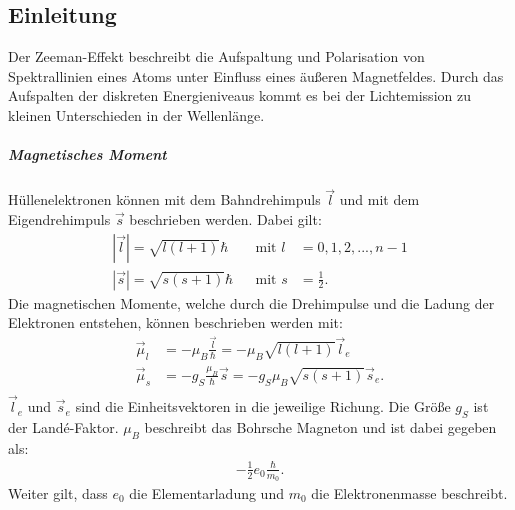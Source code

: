 \subsection{Einleitung}
Der Zeeman-Effekt beschreibt die Aufspaltung und Polarisation von Spektrallinien eines Atoms unter Einfluss eines äußeren Magnetfeldes.
Durch das Aufspalten der diskreten Energieniveaus kommt es bei der Lichtemission zu kleinen Unterschieden in der Wellenlänge.

\subparagraph{Magnetisches Moment}
Hüllenelektronen können mit dem Bahndrehimpuls $\vec{l}$ und mit dem Eigendrehimpuls $\vec{s}$ beschrieben werden.
Dabei gilt:
\begin{align*}
  |\vec{l}|=\sqrt{l(l+1)}\hbar&& \text{mit } l &= 0,1,2,...,n-1\\
  |\vec{s}|=\sqrt{s(s+1)}\hbar&& \text{mit } s &= \frac{1}{2}.
\end{align*}
Die magnetischen Momente, welche durch die Drehimpulse und die Ladung der Elektronen entstehen, können beschrieben werden mit:
\begin{align*}
  \vec{\mu}_l &= -\mu_B \frac{\vec{l}}{\hbar} = -\mu_B \sqrt{l(l+1)}\vec{l}_e\\
  \vec{\mu}_s &= -g_S \frac{\mu_B}{\hbar}\vec{s} = -g_S \mu_B \sqrt{s(s+1)}\vec{s}_e.\\
\end{align*}
$\vec{l}_e$ und $\vec{s}_e$ sind die Einheitsvektoren in die jeweilige Richung.
Die Größe $g_S$ ist der Landé-Faktor. $\mu_B$ beschreibt das Bohrsche Magneton und ist dabei gegeben als:
\begin{align*}
  -\frac{1}{2} e_0 \frac{\hbar}{m_0}.
\end{align*}
Weiter gilt, dass $e_0$ die Elementarladung und $m_0$ die Elektronenmasse beschreibt.

